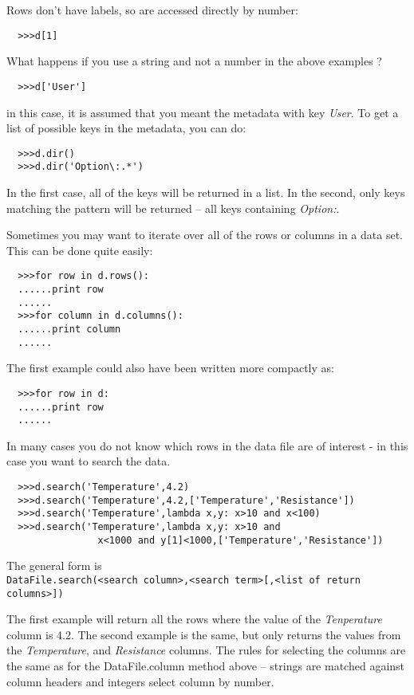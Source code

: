 \documentclass[a4paper,11pt]{scrartcl}
\begin{document}
Rows don't have labels, so are accessed directly by number:
\begin{verbatim}
  >>>d[1]
\end{verbatim}
What happens if you use a string and not a number in the above examples ?
\begin{verbatim}
  >>>d['User']
\end{verbatim}
in this case, it is assumed that you meant the metadata with key \textit{User}. To get a list of possible keys in the metadata, you can do:
\begin{verbatim}
  >>>d.dir()
  >>>d.dir('Option\:.*')
\end{verbatim}
In the first case, all of the keys will be returned in a list. In the second, only keys matching the pattern will be returned -- all keys containing \textit{Option:}.

Sometimes you may want to iterate over all of the rows or columns in a data set. This can be done quite easily:
\begin{verbatim}
  >>>for row in d.rows():
  ......print row
  ......
  >>>for column in d.columns():
  ......print column
  ......
\end{verbatim}
The first example could also have been written more compactly as:
\begin{verbatim}
  >>>for row in d:
  ......print row
  ......
\end{verbatim}

In many cases you do not know which rows in the data file are of interest - in this case you want to search the data.
\begin{verbatim}
  >>>d.search('Temperature',4.2)
  >>>d.search('Temperature',4.2,['Temperature','Resistance'])
  >>>d.search('Temperature',lambda x,y: x>10 and x<100)
  >>>d.search('Temperature',lambda x,y: x>10 and
                x<1000 and y[1]<1000,['Temperature','Resistance'])
\end{verbatim}
The general form is \\\verb:DataFile.search(<search column>,<search term>[,<list of return columns>]):

The first example will return all the rows where the value of the \textit{Tenperature} column is 4.2. The second example is the same, but only returns the values from the \textit{Temperature}, and \textit{Resistance} columns. The rules for selecting the columns are the same as for the DataFile.column method above -- strings are matched against column headers and integers select column by number.
\end{document}
